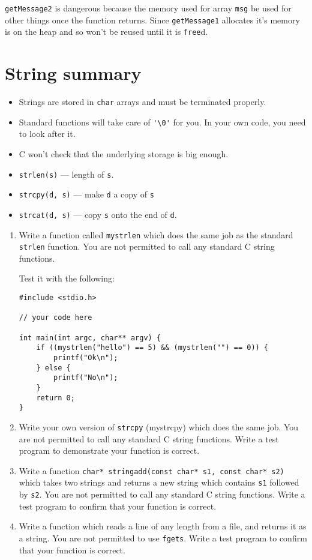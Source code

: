 \texttt{getMessage2} is dangerous because the memory used for array \texttt{msg} be used for other things once the function returns.
Since \texttt{getMessage1} allocates it's memory is on the heap and so won't be reused until it is \texttt{free}d.

\section*{String summary}
\begin{itemize}
 \item Strings are stored in \texttt{char} arrays and must be terminated properly.
 \item Standard functions will take care of \lstinline!'\0'! for you. In your own code, you need to look after it.
 \item C won't check that the underlying storage is big enough.
 \item \texttt{strlen(s)} --- length of \texttt{s}.
 \item \texttt{strcpy(d, s)} --- make \texttt{d} a copy of \texttt{s}
 \item \texttt{strcat(d, s)} --- copy \texttt{s} onto the end of \texttt{d}.
\end{itemize}


\begin{exercise}

\begin{enumerate}
\item
Write a function called \texttt{mystrlen} which does the same job as the standard \texttt{strlen} function.
You are not permitted to call any standard C string functions.

Test it with the following:
\begin{lstlisting}[numbers=none]
#include <stdio.h>

// your code here

int main(int argc, char** argv) {
    if ((mystrlen("hello") == 5) && (mystrlen("") == 0)) {
        printf("Ok\n");
    } else {
        printf("No\n");
    }
    return 0;
}
\end{lstlisting}

\item Write your own version of \texttt{strcpy} (mystrcpy) which does the same job.
You are not permitted to call any standard C string functions.
Write a test program to demonstrate your function is correct.

\item Write a function \lstinline!char* stringadd(const char* s1, const char* s2)! which takes two strings and 
returns a new string which contains \texttt{s1} followed by \texttt{s2}.
You are not permitted to call any standard C string functions.
Write a test program to confirm that your function is correct.

\item Write a function which reads a line of any length from a file, and returns it as a string.
You are not permitted to use \texttt{fgets}.
Write a test program to confirm that your function is correct.
 
\end{enumerate}
 
\end{exercise}

